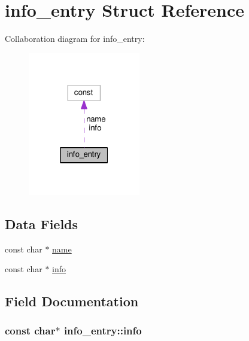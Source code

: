 \hypertarget{structinfo__entry}{}\section{info\+\_\+entry Struct Reference}
\label{structinfo__entry}


Collaboration diagram for info\+\_\+entry\+:
\nopagebreak
\begin{figure}[H]
\begin{center}
\leavevmode
\includegraphics[width=139pt]{structinfo__entry__coll__graph}
\end{center}
\end{figure}
\subsection*{Data Fields}
\begin{DoxyCompactItemize}
\item 
const char $\ast$ \hyperlink{structinfo__entry_a66d3f25172161a965052989c890fca0d}{name}
\item 
const char $\ast$ \hyperlink{structinfo__entry_a6a4dbaf4b33c79c2bd1620e03e09159d}{info}
\end{DoxyCompactItemize}


\subsection{Field Documentation}
\subsubsection[{\texorpdfstring{info}{info}}]{\setlength{\rightskip}{0pt plus 5cm}const char$\ast$ info\+\_\+entry\+::info}\hypertarget{structinfo__entry_a6a4dbaf4b33c79c2bd1620e03e09159d}{}\label{structinfo__entry_a6a4dbaf4b33c79c2bd1620e03e09159d}
